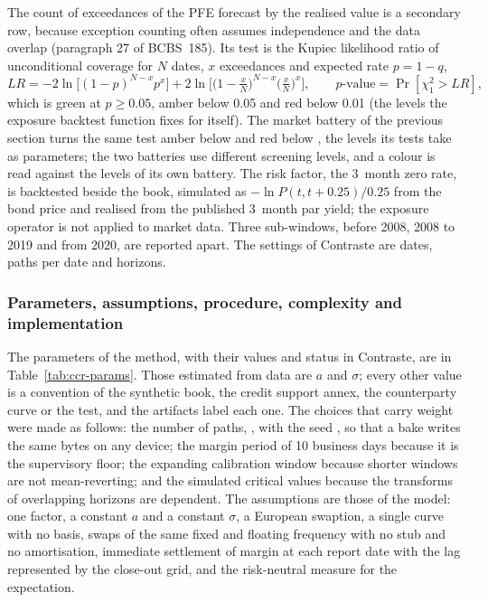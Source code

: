 The count of exceedances of the PFE forecast by the realised value is a secondary row, because exception counting often assumes independence and the data overlap (paragraph 27 of BCBS~185). Its test is the Kupiec likelihood ratio of unconditional coverage \citep{market:kupiec1995} for $N$ dates, $x$ exceedances and expected rate $p=1-q$,
\begin{equation}
LR=-2\ln\!\big[(1-p)^{N-x}p^{x}\big]+2\ln\!\Big[\big(1-\tfrac{x}{N}\big)^{N-x}\big(\tfrac{x}{N}\big)^{x}\Big],\qquad p\text{-value}=\Pr[\chi^2_1>LR],
\label{eq:ccr-kupiec}
\end{equation}
which is green at $p\ge0.05$, amber below 0.05 and red below 0.01 (the levels the exposure backtest function fixes for itself). The market battery of the previous section turns the same test amber below \mkAmberAlpha{} and red below \mkRedAlpha{}, the levels its tests take as parameters; the two batteries use different screening levels, and a colour is read against the levels of its own battery. The risk factor, the 3~month zero rate, is backtested beside the book, simulated as $-\ln P(t,t+0.25)/0.25$ from the bond price and realised from the published 3~month par yield; the exposure operator is not applied to market data. Three sub-windows, before 2008, 2008 to 2019 and from 2020,
are reported apart. The settings of Contraste are \ccrBtDates{} dates, \ccrBacktestPaths{} paths per date and \ccrBtHorizons{} horizons.

\subsubsection{Parameters, assumptions, procedure, complexity and implementation}

The parameters of the method, with their values and status in Contraste, are in Table~\ref{tab:ccr-params}. Those estimated from data are $a$ and $\sigma$; every other value is a convention of the synthetic book, the credit support annex, the counterparty curve or the test, and the artifacts label each one. The choices that carry weight were made as follows:
the number of paths, \ccrPathCount, with the seed \ccrSeed, so that a bake writes the same bytes on any device; the margin period of 10 business days because it is the supervisory floor; the expanding calibration window because shorter windows are not mean-reverting; and the simulated critical values because the transforms of overlapping horizons are dependent. The assumptions are those of the model: one factor, a constant $a$ and a constant $\sigma$, a European
swaption, a single curve with no basis, swaps of the same fixed and floating frequency with no stub and no amortisation, immediate settlement of margin at each report date with the lag represented by the close-out grid, and the risk-neutral measure for the expectation.

